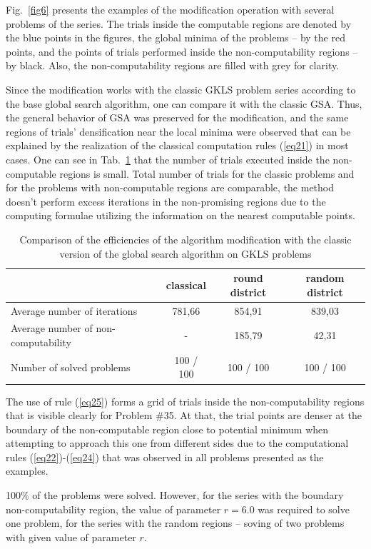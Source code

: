 \documentclass[runningheads]{llncs}
\begin{document}
Fig.~\ref{fig6} presents the examples of the modification operation with several problems of the series. The trials inside the computable regions are denoted by the blue points in the figures, the global minima of the problems – by the red points, and the points of trials performed inside the non-computability regions – by black. Also, the non-computability regions are filled with grey for clarity.

Since the modification works with the classic GKLS problem series according to the base global search algorithm, one can compare it with the classic GSA. Thus, the general behavior of GSA was preserved for the modification, and the same regions of trials’ densification near the local minima were observed that can be explained by the realization of the classical computation rules (\ref{eq21}) in most cases. One can see in Tab.~\ref{tab1} that the number of trials executed inside the non-computable regions is small. Total number of trials for the classic problems and for the problems with non-computable regions are comparable, the method doesn’t perform excess iterations in the non-promising regions due to the computing formulae utilizing the information on the nearest computable points.

\begin{table}
\caption{Comparison of the efficiencies of the algorithm modification with the classic version of the global search algorithm on GKLS problems}\label{tab1}
\begin{tabular}{|l|c|c|c|}
\hline
 &  classical  &  round district  &  random district  \\
\hline
Average number of iterations & 781,66	& 854,91 & 839,03 \\
Average number of non-computability & - & 185,79 & 42,31 \\
Number of solved problems & 100 / 100 & 100 / 100 & 100 / 100\\
\hline
\end{tabular}
\end{table}

The use of rule (\ref{eq25}) forms a grid of trials inside the non-computability regions that is visible clearly for Problem \#35. At that, the trial points are denser at the boundary of the non-computable region close to potential minimum when attempting to approach this one from different sides due to the computational rules (\ref{eq22})-(\ref{eq24}) that was observed in all problems presented as the examples. 

100\% of the problems were solved. However, for the series with the boundary non-computability region, the value of parameter $r=6.0$ was required to solve one problem, for the series with the random regions – soving of two problems with given value of parameter $r$.
\end{document}
